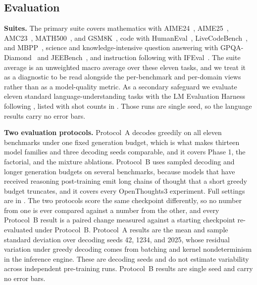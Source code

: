 \documentclass{article}
\begin{document}
\subsection{Evaluation}
\label{sec:methods-bench}

\textbf{Suites.} The primary suite covers mathematics with AIME24~\citep{aime2024}, AIME25~\citep{aime2025}, AMC23~\citep{maa2023amc}, MATH500~\citep{hendrycks2021math}, and GSM8K~\citep{cobbe2021training}, code with HumanEval~\citep{chen2021evaluating}, LiveCodeBench~\citep{jain2024livecodebench}, and MBPP~\citep{austin2021program}, science and knowledge-intensive question answering with GPQA-Diamond~\citep{rein2024gpqa} and JEEBench~\citep{arora2023have}, and instruction following with IFEval~\citep{zhou2023instruction}. The suite average is an unweighted macro average over these eleven tasks, and we treat it as a diagnostic to be read alongside the per-benchmark and per-domain views rather than as a model-quality metric. As a secondary safeguard we evaluate eleven standard language-understanding tasks with the LM Evaluation Harness~\citep{eval-harness} following \citet{nguyen2025mixturevitae_arxiv}, listed with shot counts in . Those runs are single seed, so the language results carry no error bars.

\textbf{Two evaluation protocols.} Protocol~A decodes greedily on all eleven benchmarks under one fixed generation budget, which is what makes thirteen model families and three decoding seeds comparable, and it covers Phase 1, the factorial, and the mixture ablations. Protocol~B uses sampled decoding and longer generation budgets on several benchmarks, because models that have received reasoning post-training emit long chains of thought that a short greedy budget truncates, and it covers every OpenThoughts3 experiment. Full settings are in . The two protocols score the same checkpoint differently, so no number from one is ever compared against a number from the other, and every Protocol~B result is a paired change measured against a starting checkpoint re-evaluated under Protocol~B. Protocol~A results are the mean and sample standard deviation over decoding seeds 42, 1234, and 2025, whose residual variation under greedy decoding comes from batching and kernel nondeterminism in the inference engine. These are decoding seeds and do not estimate variability across independent pre-training runs. Protocol~B results are single seed and carry no error bars.
\end{document}
